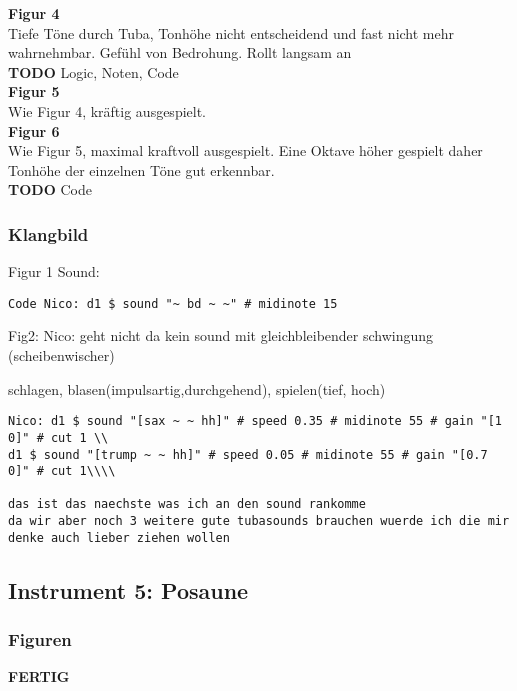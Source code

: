 \documentclass[
10pt, %
a4paper, %
oneside, %
headinclude,footinclude, %
BCOR5mm, %
]{scrartcl}
\begin{document}
\noindent\textbf{Figur 4}\\
Tiefe Töne durch Tuba, Tonhöhe nicht entscheidend und fast nicht mehr wahrnehmbar. Gefühl von Bedrohung. Rollt langsam an\\
{\color{red}\textbf{TODO}} Logic, Noten, Code\\

\noindent\textbf{Figur 5}\\
Wie Figur 4, kräftig ausgespielt.\\

\noindent\textbf{Figur 6}\\
Wie Figur 5, maximal kraftvoll ausgespielt. Eine Oktave höher gespielt daher Tonhöhe der einzelnen Töne gut erkennbar.\\
{\color{red}\textbf{TODO}} Code

\subsubsection{Klangbild}

Figur 1 Sound:
\begin{lstlisting}
Code Nico: d1 $ sound "~ bd ~ ~" # midinote 15
\end{lstlisting}

Fig2:
Nico: geht nicht da kein sound mit gleichbleibender schwingung (scheibenwischer)

schlagen, blasen(impulsartig,durchgehend), spielen(tief, hoch)\\
\begin{lstlisting}
Nico: d1 $ sound "[sax ~ ~ hh]" # speed 0.35 # midinote 55 # gain "[1 0]" # cut 1 \\
d1 $ sound "[trump ~ ~ hh]" # speed 0.05 # midinote 55 # gain "[0.7 0]" # cut 1\\\\

das ist das naechste was ich an den sound rankomme
da wir aber noch 3 weitere gute tubasounds brauchen wuerde ich die mir denke auch lieber ziehen wollen
\end{lstlisting}



\subsection{Instrument 5: Posaune}
\subsubsection{Figuren}
{\color{green}\textbf{FERTIG}} \\
\end{document}
